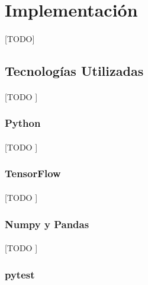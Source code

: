 \documentclass{subfiles}
\begin{document}
    \section{Implementación}
    \label{sec:implementation}

      \paragraph{}
      [TODO]

      \subsection{Tecnologías Utilizadas}
      \label{sec:used_technologies}

        \paragraph{}
        [TODO ]

        \subsubsection{Python}
        \label{sec:python}

          \paragraph{}
          [TODO ]

        \subsubsection{TensorFlow}
        \label{sec:tensorflow}

          \paragraph{}
          [TODO ]

        \subsubsection{Numpy y Pandas}
        \label{sec:numpy_pandas}

          \paragraph{}
          [TODO ]

        \subsubsection{pytest}
        \label{sec:tensorflow}
\end{document}

